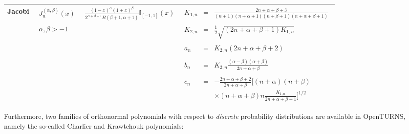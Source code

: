 {\begin{center}
\begin{tabular}{|c|c|c|c|}
      \hline
      Jacobi  &  $\begin{array}{c} J^{(\alpha,\beta)}_n(x) \\ \\ \\ \alpha,\beta>-1 \\ \end{array}$  &  $ \frac{(1-x)^{\alpha}(1+x)^{\beta}}{2^{\alpha + \beta + 1} B(\beta + 1, \alpha + 1)} \mathbb{I}_{[-1,1]}(x)$  &  $\begin{array}{ccc}  K_{1,n} & = & \frac{2n+\alpha + \beta + 3}{(n+1)(n+\alpha+1)(n+\beta+1)(n+\alpha+\beta+1)} \\ \\ K_{2,n} & = & \frac{1}{2} \sqrt{(2n + \alpha + \beta + 1) K_{1,n}} \\ \\a_n & = & K_{2,n}(2n+\alpha + \beta + 2)  \\   \\  b_n & = & K_{2,n}\frac{(\alpha - \beta)(\alpha + \beta)}{2n+\alpha+\beta} \\ \\ c_n & = & - \frac{2n+\alpha+\beta + 2}{2n+\alpha+\beta} \Big[(n+\alpha)(n+\beta) \\ & & \times (n+\alpha+\beta)n\frac{K_{1,n}}{2n+\alpha+\beta-1}\Big]^{1/2}  \end{array} $ \\
      \hline

    \end{tabular}

  \end{center}

% 

Furthermore, two families of orthonormal polynomials with respect to \emph{discrete} probability distributions are available in OpenTURNS, namely the so-called Charlier and Krawtchouk polynomials:

  \begin{center}


\end{center}}
